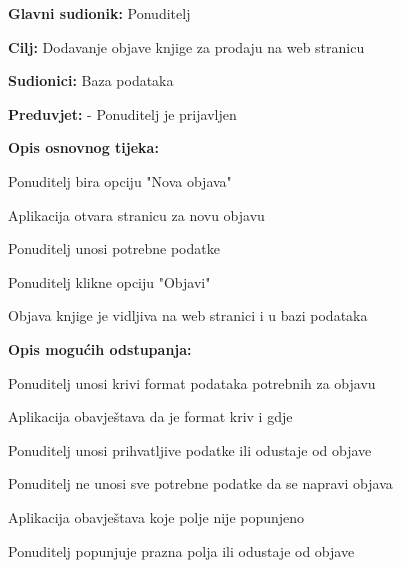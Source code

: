                     			\noindent {}
					\begin{packed_item}
	
						\item \textbf{Glavni sudionik: } Ponuditelj
						\item  \textbf{Cilj:} Dodavanje objave knjige za prodaju na web stranicu
						\item  \textbf{Sudionici:} Baza podataka
						\item  \textbf{Preduvjet:} - Ponuditelj je prijavljen
						\item  \textbf{Opis osnovnog tijeka:}
						
						\item[] \begin{packed_enum}
	
							\item Ponuditelj bira opciju "Nova objava"
                            				\item Aplikacija otvara stranicu za novu objavu
                           				 \item Ponuditelj unosi potrebne podatke
							\item Ponuditelj klikne opciju "Objavi"
                            				\item Objava knjige je vidljiva na web stranici i u bazi podataka
						\end{packed_enum}
						
						\item  \textbf{Opis mogućih odstupanja:}
						
						\item[] \begin{packed_item}
	
							\item[2.a] Ponuditelj unosi krivi format podataka potrebnih za objavu
							\item[] \begin{packed_enum}
								
								\item Aplikacija obavještava da je format kriv i gdje
								\item Ponuditelj unosi prihvatljive podatke ili odustaje od objave
							\end{packed_enum}
                            				\item[2.b] Ponuditelj ne unosi sve potrebne podatke da se napravi objava
                             				\item[] \begin{packed_enum}
                                 				\item Aplikacija obavještava koje polje nije popunjeno
                                 				\item Ponuditelj popunjuje prazna polja ili odustaje od objave
                             				\end{packed_enum}
						\end{packed_item}
					\end{packed_item}

